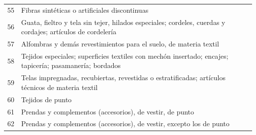\documentclass[a4paper,openright,12pt]{book}
\begin{document}
\begin{table}[]
{\begin{tabular}{@{}ll@{}}
55  & Fibras sintéticas o artificiales discontinuas                                                                                                                                                                                                                                                  \\
56  & Guata, fieltro y tela sin tejer, hilados especiales; cordeles, cuerdas y cordajes; artículos de cordelería                                                                                                                                                                                     \\
57  & Alfombras y demás revestimientos para el suelo, de materia textil                                                                                                                                                                                                                              \\
58  & Tejidos especiales; superficies textiles con mechón insertado; encajes; tapicería; pasamanería; bordados                                                                                                                                                                                       \\
59  & Telas impregnadas, recubiertas, revestidas o estratificadas; artículos técnicos de materia textil                                                                                                                                                                                              \\
60  & Tejidos de punto                                                                                                                                                                                                                                                                               \\
61  & Prendas y complementos (accesorios), de vestir, de punto                                                                                                                                                                                                                                       \\
62  & Prendas y complementos (accesorios), de vestir, excepto los de punto                                                                                                                                                                                                                           \\

\end{tabular}}
\end{table}
\end{document}
